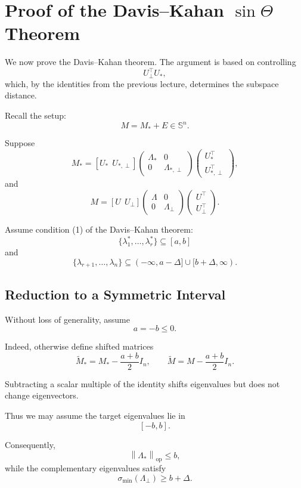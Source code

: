 \documentclass[12pt,oneside]{book}
\numberwithin{equation}{section}
\theoremstyle{definition}
\theoremstyle{plain}
\theoremstyle{remark}
\newcommand{\norm}[1]{\left\lVert #1 \right\rVert}
\begin{document}
\section{Proof of the Davis--Kahan $\sin\Theta$ Theorem}

We now prove the Davis--Kahan theorem. The argument is based on controlling
\[
U_\perp^\top U_*,
\]
which, by the identities from the previous lecture, determines the subspace distance.

Recall the setup:
\[
M=M_*+E\in\mathbb{S}^n.
\]

Suppose
\[
M_*
=
[U_*\ \ U_{*,\perp}]
\begin{pmatrix}
\Lambda_* & 0\\
0 & \Lambda_{*,\perp}
\end{pmatrix}
\begin{pmatrix}
U_*^\top\\
U_{*,\perp}^\top
\end{pmatrix},
\]
and
\[
M
=
[U\ \ U_\perp]
\begin{pmatrix}
\Lambda & 0\\
0 & \Lambda_\perp
\end{pmatrix}
\begin{pmatrix}
U^\top\\
U_\perp^\top
\end{pmatrix}.
\]

Assume condition (1) of the Davis--Kahan theorem:
\[
\{\lambda_1^*,\dots,\lambda_r^*\}\subseteq[a,b]
\]
and
\[
\{\lambda_{r+1},\dots,\lambda_n\}
\subseteq
(-\infty,a-\Delta]
\cup
[b+\Delta,\infty).
\]

\subsection{Reduction to a Symmetric Interval}

Without loss of generality, assume
\[
a=-b\leq 0.
\]

Indeed, otherwise define shifted matrices
\[
\widetilde{M}_*
=
M_*-\frac{a+b}{2}I_n,
\qquad
\widetilde{M}
=
M-\frac{a+b}{2}I_n.
\]

Subtracting a scalar multiple of the identity shifts eigenvalues but does not change eigenvectors.

Thus we may assume the target eigenvalues lie in
\[
[-b,b].
\]

Consequently,
\[
\norm{\Lambda_*}_{\mathrm{op}}
\leq b,
\]
while the complementary eigenvalues satisfy
\[
\sigma_{\min}(\Lambda_\perp)
\geq
b+\Delta.
\]
\end{document}
